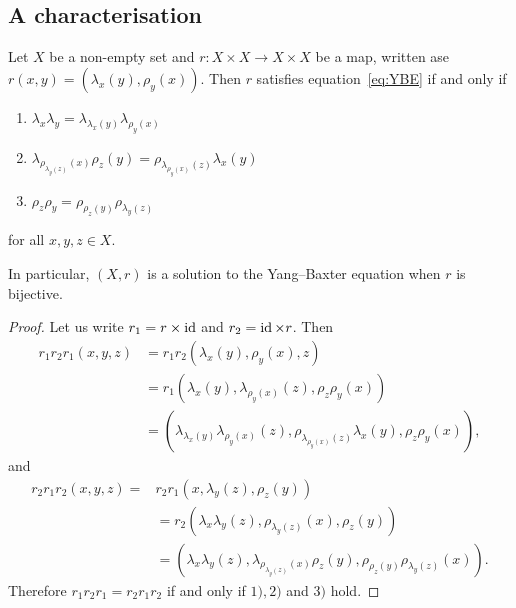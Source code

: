 \subsection{A characterisation}
    \begin{proposition}\label{prop:characterisation}
        Let $X$ be a non-empty set and $r: X \times X \to X \times X$ be a  map, written ase $r(x,y) = (\lambda_x(y),\rho_y(x))$. Then $r$ satisfies equation~\ref{eq:YBE} if and only if
    \begin{enumerate}
        \item $\lambda_x\lambda_y = \lambda_{\lambda_x(y)}\lambda_{\rho_y(x)}$
        \item $\lambda_{\rho_{\lambda_y(z)}(x)}\rho_z(y)=\rho_{\lambda_{\rho_y(x)}(z)}\lambda_x(y)$
        \item $\rho_z\rho_y=\rho_{\rho_z(y)}\rho_{\lambda_y(z)}$
    \end{enumerate}
    for all $x,y,z\in X$.

    In particular, $(X,r)$ is a solution to the Yang--Baxter equation when $r$ is bijective.
    \end{proposition}
    \begin{proof}
        Let us write $r_1=r\times \operatorname{id}$ and $r_2=\operatorname{id} \times r$. Then  
        \begin{align*}
            r_1r_2r_1(x,y,z)& = r_1r_2(\lambda_x(y),\rho_y(x),z) \\
            &= r_1(\lambda_x(y),\lambda_{\rho_y(x)}(z),\rho_z\rho_y(x))\\
            &= (\lambda_{\lambda_x(y)}\lambda_{\rho_y(x)}(z),\rho_{\lambda_{\rho_y(x)}(z)}\lambda_x(y),\rho_z\rho_y(x)),
        \end{align*}
        and 
        \begin{align*}
            r_2r_1r_2(x,y,z) =& r_2r_1(x,\lambda_y(z),\rho_z(y)) \\
            &= r_2(\lambda_x\lambda_y(z),\rho_{\lambda_y(z)}(x),\rho_z(y))\\
            &= (\lambda_x\lambda_y(z),\lambda_{\rho_{\lambda_y(z)}(x)}\rho_z(y),\rho_{\rho_z(y)}\rho_{\lambda_y(z)}(x)).
        \end{align*}
        Therefore $r_1r_2r_1= r_2r_1r_2$ if and only if $1), 2)$ and $3)$ hold.     
    \end{proof}

